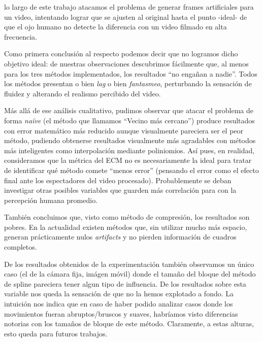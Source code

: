  lo largo de este trabajo atacamos el problema de generar
frames artificiales para un video, intentando lograr que se ajusten al original
hasta el punto -ideal- de que el ojo humano no detecte la diferencia con un
video filmado en alta frecuencia.

\par Como primera conclusión al respecto podemos decir que no logramos dicho
objetivo ideal: de nuestras observaciones descubrimos fácilmente que, al menos
para los tres métodos implementados, los resultados ``no engañan a nadie''.
Todos los métodos presentan o bien \emph{lag} o bien \emph{fantasmeo},
perturbando la sensación de fluidez y alterando el realismo percibido del
video.

\par Más allá de ese análisis cualitativo, pudimos observar que atacar el
problema de forma \emph{naïve} (el método que llamamos ``Vecino más cercano'')
produce resultados con error matemático más reducido aunque visualmente
pareciera ser el peor método, pudiendo obtenerse resultados visualmente más
agradables con métodos más inteligentes como interpolación mediante
poliniomios. As\'i pues, en realidad, consideramos que la m\'etrica del ECM
no es necesariamente la ideal para tratar de identificar qué m\'etodo comete
``menos error'' (pensando el error como el efecto final ante los espectadores
del video procesado). Probablemente se deban investigar otras posibles variables
que guarden más correlaci\'on para con la percepci\'on humana promedio.

\par También concluimos que, visto como método de compresión, los resultados
son pobres. En la actualidad existen métodos que, sin utilizar mucho más
espacio, generan prácticamente nulos \emph{artifacts} y no pierden información
de cuadros completos.

\par De los resultados obtenidos de la experimentaci\'on tambi\'en observamos
un \'unico caso (el de la c\'amara fija, im\'agen m\'ovil) donde el tama\~no
del bloque del m\'etodo de spline pareciera tener algun tipo de influencia.
De los resultados sobre esta variable nos queda la sensaci\'on de que no
la hemos explotado a fondo. La intuici\'on nos indica que en caso de haber
podido analizar casos donde los movimientos fueran abruptos/bruscos y suaves,
habr\'iamos visto diferencias notorias con los tama\~nos de bloque de este
m\'etodo. Claramente, a estas alturas, esto queda para futuros trabajos.

